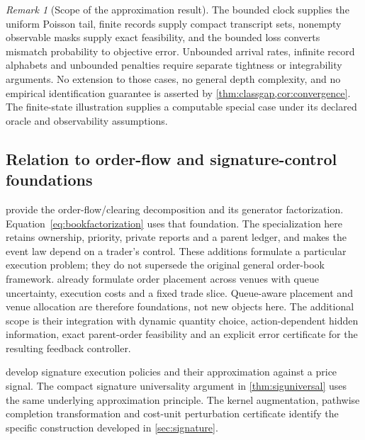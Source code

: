 \documentclass[11pt]{article}
\numberwithin{equation}{section}
\theoremstyle{definition}
\theoremstyle{remark}
\newtheorem{remark}[theorem]{Remark}
\theoremstyle{definition}
\begin{document}
\begin{remark}[Scope of the approximation result]\label{rem:scopelimits}
The bounded clock supplies the uniform Poisson tail, finite records supply
compact transcript sets, nonempty observable masks supply exact feasibility,
and the bounded loss converts mismatch probability to objective error.
Unbounded arrival rates, infinite record alphabets and unbounded penalties
require separate tightness or integrability arguments. No extension to
those cases, no general depth complexity, and no empirical identification
guarantee is asserted by \cref{thm:classgap,cor:convergence}. The finite-state
illustration supplies a computable special case under its declared oracle
and observability assumptions.
\end{remark}





\subsection{Relation to order-flow and signature-control foundations}
\label{sec:novelty}

\citet{contdegondxuan2025} provide the order-flow/clearing decomposition
and its generator factorization. Equation~\eqref{eq:bookfactorization}
uses that foundation. The specialization here retains ownership, priority,
private reports and a parent ledger, and makes the event law depend on a
trader's control. These additions formulate a particular execution problem;
they do not supersede the original general order-book framework.
\citet{cont2017} already formulate order placement across venues with queue
uncertainty, execution costs and a fixed trade slice. Queue-aware placement
and venue allocation are therefore foundations, not new objects here. The
additional scope is their integration with dynamic quantity choice,
action-dependent hidden information, exact parent-order feasibility and an
explicit error certificate for the resulting feedback controller.

\citet{kalsi2020} develop signature execution policies and their
approximation against a price signal. The compact signature universality
argument in \cref{thm:siguniversal} uses the same underlying approximation
principle. The kernel augmentation, pathwise completion transformation and
cost-unit perturbation certificate identify the specific construction
developed in \cref{sec:signature}.
\end{document}
